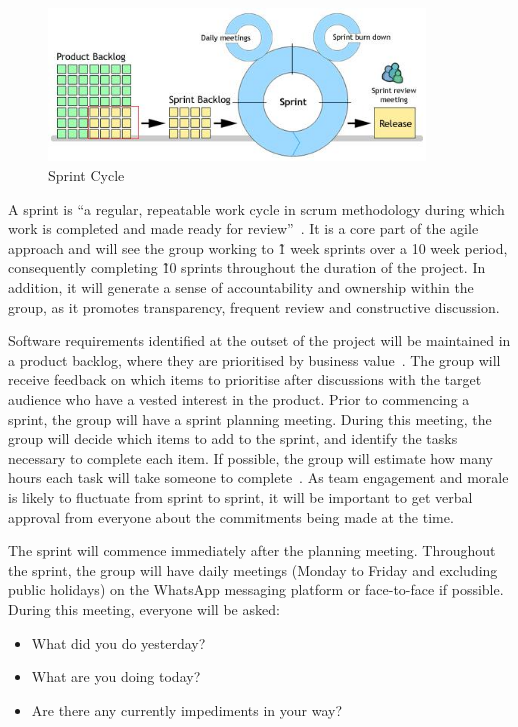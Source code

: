 \begin{figure}
  \centering
  \begin{minipage}{10cm}
    \centering
    \includegraphics[width=10cm]{inc/sprint_cycle.jpg}
    \caption{Sprint Cycle}
    \label{fig:spint_cycle}
  \end{minipage}
\end{figure}

A sprint is ``a regular, repeatable work cycle in scrum methodology during which work is completed and made ready for review''~\parencite{web:scrum_sprint}. It is a core part of the agile approach and will see the group working to \~1 week sprints over a 10 week period, consequently completing \~10 sprints throughout the duration of the project. In addition, it will generate a sense of accountability and ownership within the group, as it promotes transparency, frequent review and constructive discussion.

Software requirements identified at the outset of the project will be maintained in a product backlog, where they are prioritised by business value~\parencite{book:agile_excellence}. The group will receive feedback on which items to prioritise after discussions with the target audience who have a vested interest in the product. Prior to commencing a sprint, the group will have a sprint planning meeting. During this meeting, the group will decide which items to add to the sprint, and identify the tasks necessary to complete each item. If possible, the group will estimate how many hours each task will take someone to complete~\parencite{web:scrum_sprint}. As team engagement and morale is likely to fluctuate from sprint to sprint, it will be important to get verbal approval from everyone about the commitments being made at the time.

The sprint will commence immediately after the planning meeting. Throughout the sprint, the group will have daily meetings (Monday to Friday and excluding public holidays) on the WhatsApp messaging platform or face-to-face if possible. During this meeting, everyone will be asked:

\begin{itemize}
  \item What did you do yesterday?
  \item What are you doing today?
  \item Are there any currently impediments in your way?
\end{itemize}

